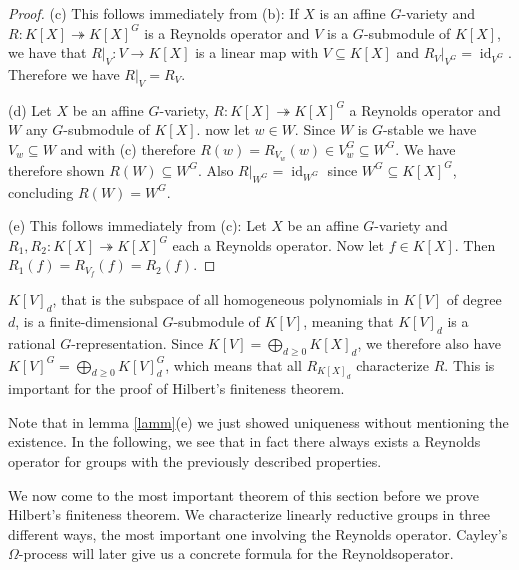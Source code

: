 \begin{proof}
  (c) \; This follows immediately from (b):
  If $X$ is an affine $G$-variety and $R \colon K[X] \twoheadrightarrow K[X]^G$ is a Reynolds operator and $V$ is a $G$-submodule of $K[X]$, we have that $\left. R \right|_V \colon V \rightarrow K[X]$ is a linear map with $V \subseteq K[X]$ and $\left. R_V \right|_{V^G} = \operatorname{id}_{V^G}$.
  Therefore we have $\left. R \right|_V = R_V$.
  
  (d) \; Let $X$ be an affine $G$-variety, $R \colon K[X] \twoheadrightarrow K[X]^G$ a Reynolds operator and $W$ any $G$-submodule of $K[X]$.
  now let $w \in W$.
  Since $W$ is $G$-stable we have $V_w \subseteq W$ and with (c) therefore $R(w) = R_{V_w} (w) \in V_w^G \subseteq W^G$. %
  We have therefore shown $R(W) \subseteq W^G$.
  Also $\left. R \right|_{W^G} = \operatorname{id}_{W^G}$ since $W^G \subseteq K[X]^G$, concluding $R(W) = W^G$.
  
  (e) \; This follows immediately from (c):
  Let $X$ be an affine $G$-variety and $R_1,R_2 \colon K[X] \twoheadrightarrow K[X]^G$ each a Reynolds operator.
  Now let $f \in K[X]$.
  Then $R_1(f) = R_{V_f} (f) = R_2 (f)$. %
\end{proof}

\begin{remark}
  $K[V]_d$, that is the subspace of all homogeneous polynomials in $K[V]$ of degree $d$, is a finite-dimensional $G$-submodule of $K[V]$, meaning that $K[V]_d$ is a rational $G$-representation.
  Since $K[V] = \bigoplus_{d \geq 0} K[X]_d$, we therefore also have $K[V]^G = \bigoplus_{d \geq 0} K[V]_d^G$, which means that all $R_{K[X]_d}$ characterize $R$.
  This is important for the proof of Hilbert's finiteness theorem.
\end{remark}

\begin{remark}
  Note that in lemma \ref{lamm}(e) we just showed uniqueness without mentioning the existence.
  In the following, we see that in fact there always exists a Reynolds operator for groups with the previously described properties.
\end{remark}

We now come to the most important theorem of this section before we prove Hilbert's finiteness theorem.
We characterize linearly reductive groups in three different ways, the most important one involving the Reynolds operator.
\linebreak Cayley's $\Omega$-process will later give us a concrete formula for the Reynolds\linebreak operator.

